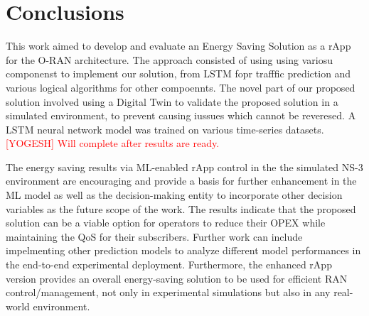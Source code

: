 \section{Conclusions}
This work aimed to develop and evaluate an Energy Saving Solution as a rApp for the O-RAN architecture. 
The approach consisted of using using variosu componenst to implement our solution, from LSTM fopr trafffic prediction and various logical algorithms for other compoennts. 
The novel part of our proposed solution involved using a Digital Twin to validate the proposed solution in a simulated environment, to prevent causing iussues which cannot be reveresed.
A LSTM neural network model was trained on various time-series datasets. 
\textcolor{red}{[YOGESH] Will complete after results are ready. \\}


The energy saving results via ML-enabled rApp control in the the simulated NS-3 environment are encouraging and provide a basis for further enhancement in the ML model as well as the decision-making entity to incorporate other decision variables as the future scope of the work. 
The results indicate that the proposed solution can be a viable option for operators to reduce their OPEX while maintaining the QoS for their subscribers.
Further work can include impelmenting other prediction models to analyze different model performances in the end-to-end experimental deployment. 
Furthermore, the enhanced rApp version provides an overall energy-saving solution to be used for efficient RAN control/management, not only in experimental simulations but also in any real-world environment.
